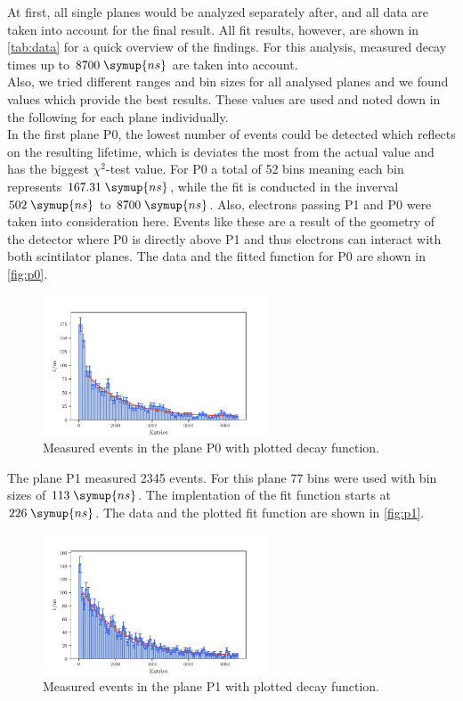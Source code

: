 At first, all single planes would be analyzed separately after, and all data are taken into account for the final result. All fit results, however, are shown in 
\autoref{tab:data} for a quick overview of the findings. For this analysis, 
measured decay times up to $8700 \; \symup{ns}$ are taken into account.\\
Also, we tried different ranges and bin sizes for all analysed planes and we found 
values which provide the best results. 
These values are used and noted down in the following for each plane individually. \\
In the first plane P0, the lowest number of events could be detected which reflects on the resulting lifetime, which is deviates the most from the actual value and has the biggest $\chi^2$-test value.
For P0 a total of 52 bins meaning each bin represents $167.31 \; \symup{ns}$, while the fit is conducted in the inverval $502\; \symup{ns}$ to $8700 \; \symup{ns}$.
Also, electrons passing P1 and P0 were taken into consideration here. Events like these are a result of 
the geometry of the detector where P0 is directly above P1 and thus electrons can interact with both scintilator planes.
The data and the fitted function for P0 are shown in \autoref{fig:p0}.\\
\begin{figure}
    \centering
    \includegraphics[width=0.6\textwidth]{plots/p0.pdf}
    \caption{Measured events in the plane P0 with plotted decay function.}
    \label{fig:p0}
\end{figure}

The plane P1 measured 2345 events.
For this plane 77 bins were used with bin sizes of $113 \; \symup{ns}$. The implentation of 
the fit function starts at $226 \; \symup{ns}$. The data and the plotted fit function are shown in \autoref{fig:p1}.\\

\begin{figure}
    \centering
    \includegraphics[width=0.6\textwidth]{plots/p1.pdf}
    \caption{Measured events in the plane P1 with plotted decay function.}
    \label{fig:p1}
\end{figure}

